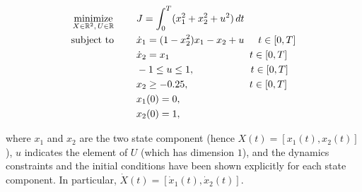 \begin{subequations}\label{eq:vanderpol}
	\begin{align}
	\underset{X \in \mathbb{R}^{2}, \, U \in \mathbb{R}}{\text{minimize}}\hspace{8mm} 
	&J = \int_{0}^{T}(x_1^{2} + x_2^{2} + u^{2})\,dt  \label{eq:vancost}\\
	\text{subject to} \hspace{8mm} 
	& \dot{x}_1 = (1 - x_2^{2})x_{1} - x_2 + u \hspace{5mm} t \in[0,T] \label{eq:vandyn1}\\
	& \dot{x}_2 = x_1 \hspace{28.5mm} t \in[0,T] \label{eq:vandyn2}\\
	& -1  \leq u \leq 1,  \hspace{20mm} t \in[0,T] \label{eq:vanpath1}\\
	& x_2 \geq -0.25,  \hspace{21.5mm} t \in[0,T] \label{eq:vanpath2}\\
	& x_1(0) = 0, \label{eq:initial1}\\		
	& x_2(0) = 1, \label{eq:intial2}		
	\end{align}
\end{subequations}

where $x_1$ and $x_2$ are the two state component (hence $X(t) = [x_1(t), x_2(t)]$), $u$ indicates the element of $U$ (which has dimension $1$), and the dynamics constraints and the initial conditions have been shown explicitly for each state component. In particular, $\dot{X}(t) = [\dot{x}_1(t), \dot{x}_2(t)]$.

